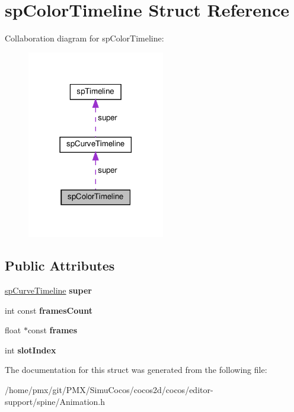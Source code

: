 \hypertarget{structspColorTimeline}{}\section{sp\+Color\+Timeline Struct Reference}
\label{structspColorTimeline}


Collaboration diagram for sp\+Color\+Timeline\+:
\nopagebreak
\begin{figure}[H]
\begin{center}
\leavevmode
\includegraphics[width=170pt]{structspColorTimeline__coll__graph}
\end{center}
\end{figure}
\subsection*{Public Attributes}
\begin{DoxyCompactItemize}
\item 
\mbox{\label{structspColorTimeline_af23a40d79910eca2b71796042bcc6857}} 
\hyperlink{structspCurveTimeline}{sp\+Curve\+Timeline} {\bfseries super}
\item 
\mbox{\label{structspColorTimeline_af190403d9bdac1668d6aca98a34963d0}} 
int const {\bfseries frames\+Count}
\item 
\mbox{\label{structspColorTimeline_a65c11a78974a79ef3bf68a92a25465a4}} 
float $\ast$const {\bfseries frames}
\item 
\mbox{\label{structspColorTimeline_ae8f205f9efa20ca40c8bb51c5d7737f7}} 
int {\bfseries slot\+Index}
\end{DoxyCompactItemize}


The documentation for this struct was generated from the following file\+:\begin{DoxyCompactItemize}
\item 
/home/pmx/git/\+P\+M\+X/\+Simu\+Cocos/cocos2d/cocos/editor-\/support/spine/Animation.\+h\end{DoxyCompactItemize}
